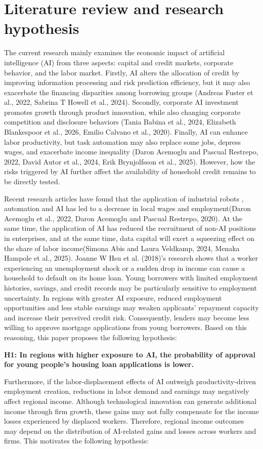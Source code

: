 \documentclass[11pt,a4paper]{article}
\begin{document}
\section*{Literature review and research hypothesis}
The current research mainly examines the economic impact of artificial intelligence (AI) from three aspects: capital and credit markets, corporate behavior, and the labor market. Firstly, AI alters the allocation of credit by improving information processing and risk prediction efficiency, but it may also exacerbate the financing disparities among borrowing groups (Andreas Fuster et al., 2022, Sabrina T Howell et al., 2024). Secondly, corporate AI investment promotes growth through product innovation, while also changing corporate competition and disclosure behaviors (Tania Babina et al., 2024, Elizabeth Blankespoor et al., 2026, Emilio Calvano et al., 2020). Finally, AI can enhance labor productivity, but task automation may also replace some jobs, depress wages, and exacerbate income inequality (Daron Acemoglu and Pascual Restrepo, 2022, David Autor et al., 2024, Erik Brynjolfsson et al., 2025). However, how the risks triggered by AI further affect the availability of household credit remains to be directly tested.

Recent research articles have found that the application of industrial robots , automation and AI has led to a decrease in local wages and employment(Daron Acemoglu et al., 2022, Daron Acemoglu and Pascual Restrepo, 2020). At the same time, the application of AI has reduced the recruitment of non-AI positions in enterprises, and at the same time, data capital will exert a squeezing effect on the share of labor income(Simona Abis and Laura Veldkamp, 2024, Menaka Hampole et al., 2025). Joanne W Hsu et al. (2018)'s research shows that a worker experiencing an unemployment shock or a sudden drop in income can cause a household to default on its home loan. Young borrowers with limited employment histories, savings, and credit records may be particularly sensitive to employment uncertainty. In regions with greater AI exposure, reduced employment opportunities and less stable earnings may weaken applicants' repayment capacity and increase their perceived credit risk. Consequently, lenders may become less willing to approve mortgage applications from young borrowers. Based on this reasoning, this paper proposes the following hypothesis:

\noindent\textbf{H1: In regions with higher exposure to AI, the probability of approval for young people's housing loan applications is lower.}\par
Furthermore, if the labor-displacement effects of AI outweigh productivity-driven employment creation, reductions in labor demand and earnings may negatively affect regional income. Although technological innovation can generate additional income through firm growth, these gains may not fully compensate for the income losses experienced by displaced workers. Therefore, regional income outcomes may depend on the distribution of AI-related gains and losses across workers and firms. This motivates the following hypothesis:
\end{document}
